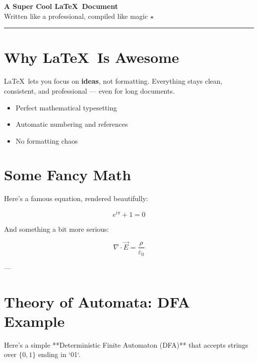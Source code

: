 \documentclass[11pt]{article}
\begin{document}
\begin{center}
    {\Huge\bfseries\color{coolblue} A Super Cool \LaTeX\ Document}\\[0.5em]
    {\large Written like a professional, compiled like magic $\star$}\\[1em]
    \rule{0.8\textwidth}{0.5pt}
\end{center}

\vspace{1em}

\section*{Why \LaTeX\ Is Awesome}

\LaTeX\ lets you focus on \textbf{ideas}, not formatting.  
Everything stays clean, consistent, and professional — even for long documents.

\begin{itemize}
    \item Perfect mathematical typesetting
    \item Automatic numbering and references
    \item No formatting chaos
\end{itemize}

\section*{Some Fancy Math}

Here’s a famous equation, rendered beautifully:

\[
    e^{i\pi} + 1 = 0
\]

And something a bit more serious:

\[
    \nabla \cdot \vec{E} = \frac{\rho}{\varepsilon_0}
\]

---

\section*{Theory of Automata: DFA Example}

Here’s a simple **Deterministic Finite Automaton (DFA)** that accepts strings over $\{0,1\}$ ending in `01`.

\begin{center}
\end{center}
\end{document}
